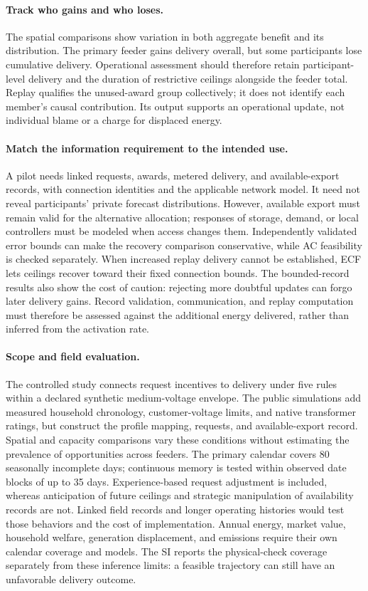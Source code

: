\documentclass[twoside,twocolumn,9pt]{article}
\begin{document}
\paragraph{Track who gains and who loses.}
The spatial comparisons show variation in both aggregate benefit and its
distribution. The primary feeder gains delivery overall, but some participants
lose cumulative delivery. Operational assessment should therefore retain
participant-level delivery and the duration of restrictive ceilings alongside
the feeder total. Replay qualifies the unused-award group collectively;
it does not identify each member's causal contribution. Its output supports
an operational update, not individual blame or a charge for displaced energy.

\paragraph{Match the information requirement to the intended use.}
A pilot needs linked requests, awards, metered delivery, and available-export
records, with connection identities and the applicable network model.
It need not reveal participants' private forecast distributions. However,
available export must remain valid for the alternative allocation; responses
of storage, demand, or local controllers must be modeled when access changes
them. Independently validated error bounds can make the recovery comparison
conservative, while AC feasibility is checked separately. When increased
replay delivery cannot be established, ECF lets ceilings recover toward
their fixed connection bounds. The bounded-record results also show the cost of caution:
rejecting more doubtful updates can forgo later delivery gains. Record
validation, communication, and replay computation must therefore be assessed
against the additional energy delivered, rather than inferred from the
activation rate.

\paragraph{Scope and field evaluation.}
The controlled study connects request incentives to delivery under five rules
within a declared synthetic medium-voltage envelope. The public simulations
add measured household chronology, customer-voltage limits, and native
transformer ratings, but construct the profile mapping, requests, and
available-export record. Spatial and capacity comparisons vary these
conditions without estimating the prevalence of opportunities across feeders.
The primary calendar covers 80 seasonally incomplete days; continuous memory
is tested within observed date blocks of up to 35 days. Experience-based
request adjustment is included, whereas anticipation of future ceilings and
strategic manipulation of availability records are not. Linked field records
and longer operating histories would test those behaviors and the cost of
implementation. Annual energy, market value, household welfare, generation
displacement, and emissions require their own calendar coverage and models.
The SI reports the physical-check coverage separately from these inference
limits: a feasible trajectory can still have an unfavorable delivery outcome.
\end{document}
